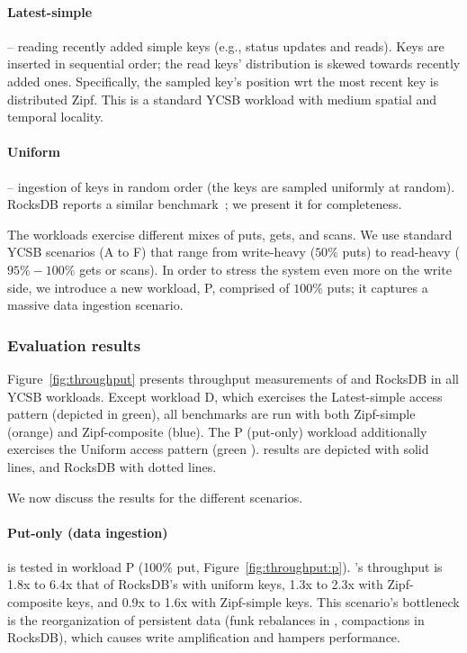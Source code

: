 \paragraph{Latest-simple} -- reading  recently added simple keys (e.g., status updates and reads). 
Keys are inserted in sequential  order; the read keys' distribution is skewed towards recently added ones. 
Specifically, the sampled key's position wrt the most recent key is distributed Zipf. This is a 
standard YCSB workload with medium spatial and temporal locality.

\paragraph{Uniform} -- ingestion of keys in random order (the keys are sampled uniformly at random). RocksDB
reports a similar benchmark~\cite{rocksdb-benchmarks}; we present it for completeness.

The workloads exercise different mixes of puts, gets, and scans. We use standard YCSB scenarios 
(A to F) that range from write-heavy ($50\%$ puts) to read-heavy ($95\%-100\%$ gets or scans). 
In order to stress the system even more on the write side, we introduce a new workload,  
P, comprised of $100\%$ puts; it captures a massive data ingestion scenario. 

\subsubsection{Evaluation results}
Figure~\ref{fig:throughput} presents throughput measurements of \sys\/ and RocksDB
in all YCSB workloads. Except workload D, which exercises the Latest-simple access pattern
(depicted in green), all benchmarks are run with both  Zipf-simple (orange) 
and Zipf-composite (blue). The P (put-only) workload 
additionally exercises the Uniform access pattern (green ). \sys\/ results are depicted with solid
lines, and RocksDB with dotted lines. 

We now discuss the results for the different scenarios.
  
\paragraph{ Put-only (data ingestion)} is tested in workload
{P} (100\% put, Figure~\ref{fig:throughput:p}). 
\sys's throughput is 1.8x to 6.4x that of RocksDB's with uniform keys, 1.3x to 2.3x with Zipf-composite keys, 
and 0.9x to 1.6x with Zipf-simple keys. This scenario's bottleneck is the reorganization of persistent data  
(funk rebalances in \sys, compactions in RocksDB), which causes write amplification and hampers performance. 
 
